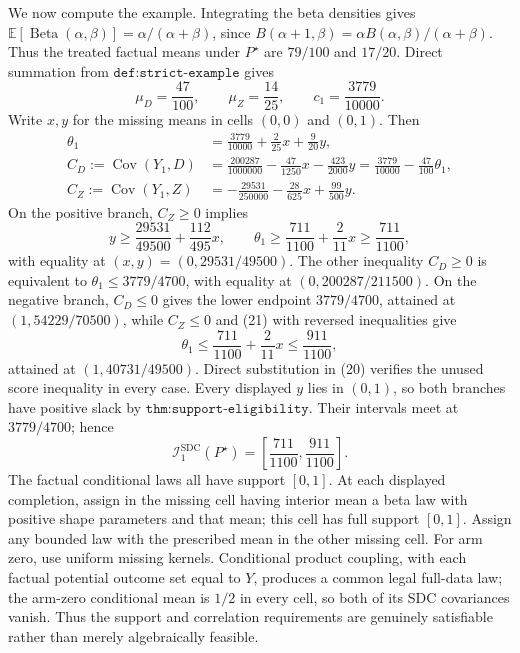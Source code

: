 We now compute the example.  Integrating the beta densities gives \(\mathbb E[\operatorname{Beta}(\alpha,\beta)]=\alpha/(\alpha+\beta)\), since \(B(\alpha+1,\beta)=\alpha B(\alpha,\beta)/(\alpha+\beta)\).  Thus the treated factual means under \(P^\star\) are \(79/100\) and \(17/20\).  Direct summation from \(\texttt{def:strict-example}\) gives
\[
 \mu_D=\frac{47}{100},\qquad
 \mu_Z=\frac{14}{25},\qquad
 c_1=\frac{3779}{10000}.
\]
Write \(x,y\) for the missing means in cells \((0,0)\) and \((0,1)\).  Then
\[
 \begin{aligned}
 \theta_1&=\frac{3779}{10000}+\frac{2}{25}x+\frac{9}{20}y,\\
 C_D:=\operatorname{Cov}(Y_1,D)
 &=\frac{200287}{1000000}-\frac{47}{1250}x-\frac{423}{2000}y
   =\frac{3779}{10000}-\frac{47}{100}\theta_1,\\
 C_Z:=\operatorname{Cov}(Y_1,Z)
 &=-\frac{29531}{250000}-\frac{28}{625}x+\frac{99}{500}y.
 \end{aligned}                                                               \tag{20}
\]
On the positive branch, \(C_Z\ge0\) implies
\[
 y\ge\frac{29531}{49500}+\frac{112}{495}x,
 \qquad
 \theta_1\ge\frac{711}{1100}+\frac{2}{11}x\ge\frac{711}{1100},             \tag{21}
\]
with equality at \((x,y)=(0,29531/49500)\).  The other inequality \(C_D\ge0\) is equivalent to \(\theta_1\le3779/4700\), with equality at \((0,200287/211500)\).  On the negative branch, \(C_D\le0\) gives the lower endpoint \(3779/4700\), attained at \((1,54229/70500)\), while \(C_Z\le0\) and (21) with reversed inequalities give
\[
 \theta_1\le\frac{711}{1100}+\frac{2}{11}x\le\frac{911}{1100},              \tag{22}
\]
attained at \((1,40731/49500)\).  Direct substitution in (20) verifies the unused score inequality in every case.  Every displayed \(y\) lies in \((0,1)\), so both branches have positive slack by \(\texttt{thm:support-eligibility}\).  Their intervals meet at \(3779/4700\); hence
\[
 \mathcal I_1^{\mathrm{SDC}}(P^\star)
 =\left[\frac{711}{1100},\frac{911}{1100}\right].                            \tag{23}
\]
The factual conditional laws all have support \([0,1]\).  At each displayed completion, assign in the missing cell having interior mean a beta law with positive shape parameters and that mean; this cell has full support \([0,1]\).  Assign any bounded law with the prescribed mean in the other missing cell.  For arm zero, use uniform missing kernels.  Conditional product coupling, with each factual potential outcome set equal to \(Y\), produces a common legal full-data law; the arm-zero conditional mean is \(1/2\) in every cell, so both of its SDC covariances vanish.  Thus the support and correlation requirements are genuinely satisfiable rather than merely algebraically feasible.

